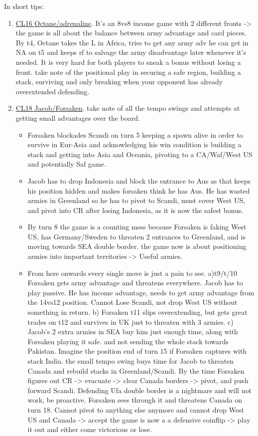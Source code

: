 In short tips:
\begin{enumerate}
    \item \href{https://www.warzone.com/MultiPlayer?GameID=33909207}{CL16 Octane/adrenaline}. It's an 8vs8 income game with 2 different fronts -> the game is all about the balance between army advantage and card pieces. By t4, Octane takes the L in Africa, tries to get any army adv he can get in NA on t5 and keeps rf to salvage the army disadvantage later whenever it's needed. It is very hard for both players to sneak a bonus without losing a front. take note of the positional play in securing a safe region, building a stack, surviving and only breaking when your opponent has already overextended defending. 
    \item \href{https://www.warzone.com/MultiPlayer?GameID=40954287}{CL18 Jacob/Forsaken}. take note of all the tempo swings and attempts at getting small advantages over the board.
    \begin{itemize}
        \item Forsaken blockades Scandi on turn 5 keeping a spawn alive in order to survive in Eur-Asia and acknowledging his win condition is building a stack and getting into Asia and Oceania, pivoting to a CA/Waf/West US and potentially Saf game.
        \item Jacob has to drop Indonesia and block the entrance to Aus as that keeps his position hidden and makes forsaken think he has Aus. He has wasted armies in Greenland so he has to pivot to Scandi, must cover West US, and pivot into CR after losing Indonesia, as it is now the safest bonus. 
        \item By turn 8 the game is a counting mess because Forsaken is faking West US, has Germany/Sweden to threaten 2 entrances to Greenland, and is moving towards SEA double border. the game now is about positioning armies into important territories -> Useful armies.
        \item From here onwards every single move is just a pain to see. a)t9/t/10 Forsaken gets army advantage and threatens everywhere. Jacob has to play passive. He has income advantage, needs to get army advantage from the 14vs12 position. Cannot Lose Scandi, not drop West US without something in return. b) Forsaken t11 slips overextending, but gets great trades on t12 and survives in UK just to threaten with 3 armies. c) Jacob's 2 extra armies in SEA buy him just enough time, along with Forsaken playing it safe. and not sending the whole stack towards Pakistan. Imagine the position end of turn 15 if Forsaken captures with stack India. the small tempo swing buys time for Jacob to threaten Canada and rebuild stacks in Greenland/Scandi. By the time Forsaken figures out CR -> evacuate -> clear Canada borders -> pivot, and push forward Scandi. Defending Ufa double border is a nightmare and will not work, be proactive. Forsaken sees through it and threatens Canada on turn 18. Cannot pivot to anything else anymore and cannot drop West US and Canada -> accept the game is now a a defensive coinflip -> play it out and either come victorious or lose.
    \end{itemize}
\end{enumerate}

